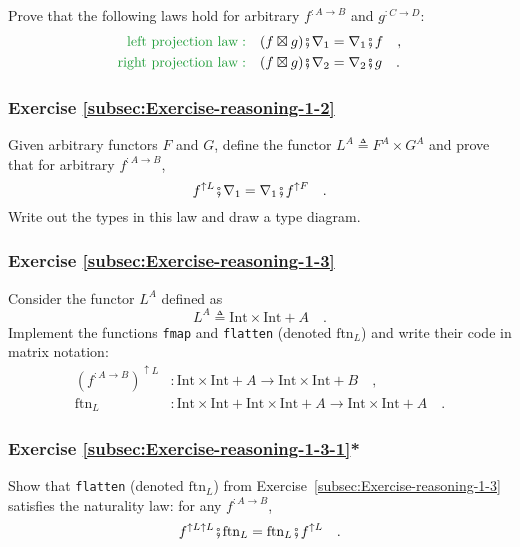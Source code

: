 Prove that the following laws hold for arbitrary $f^{:A\rightarrow B}$
and $g^{:C\rightarrow D}$:
\begin{align*}
{\color{greenunder}\text{left projection law}:}\quad & (f\boxtimes g)\bef\nabla_{1}=\nabla_{1}\bef f\quad,\\
{\color{greenunder}\text{right projection law}:}\quad & (f\boxtimes g)\bef\nabla_{2}=\nabla_{2}\bef g\quad.
\end{align*}


\subsubsection{Exercise \label{subsec:Exercise-reasoning-1-2}\ref{subsec:Exercise-reasoning-1-2}}

Given arbitrary functors $F$ and $G$, define the functor $L^{A}\triangleq F^{A}\times G^{A}$
and prove that for arbitrary $f^{:A\rightarrow B}$,
\[
f^{\uparrow L}\bef\nabla_{1}=\nabla_{1}\bef f^{\uparrow F}\quad.
\]
Write out the types in this law and draw a type diagram. 

\subsubsection{Exercise \label{subsec:Exercise-reasoning-1-3}\ref{subsec:Exercise-reasoning-1-3}}

Consider the functor $L^{A}$ defined as 
\[
L^{A}\triangleq\text{Int}\times\text{Int}+A\quad.
\]
Implement the functions \lstinline!fmap! and \lstinline!flatten!
(denoted $\text{ftn}_{L}$) and write their code in matrix notation:
\begin{align*}
(f^{:A\rightarrow B})^{\uparrow L} & :\text{Int}\times\text{Int}+A\rightarrow\text{Int}\times\text{Int}+B\quad,\\
\text{ftn}_{L} & :\text{Int}\times\text{Int}+\text{Int}\times\text{Int}+A\rightarrow\text{Int}\times\text{Int}+A\quad.
\end{align*}


\subsubsection{Exercise \label{subsec:Exercise-reasoning-1-3-1}\ref{subsec:Exercise-reasoning-1-3-1}{*}}

Show that \lstinline!flatten! (denoted $\text{ftn}_{L}$) from Exercise~\ref{subsec:Exercise-reasoning-1-3}
satisfies the naturality law: for any $f^{:A\rightarrow B}$,
\[
f^{\uparrow L\uparrow L}\bef\text{ftn}_{L}=\text{ftn}_{L}\bef f^{\uparrow L}\quad.
\]

